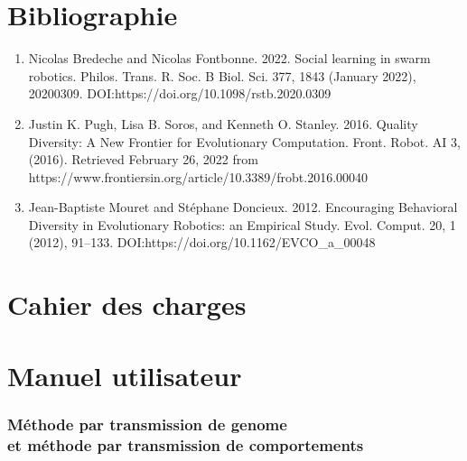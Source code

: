 \documentclass[a4paper, 12pt]{report}
\begin{document}
    \chapter{Bibliographie}
    \begin{enumerate}
	\item {Nicolas Bredeche and Nicolas Fontbonne. 2022. Social learning in swarm robotics. Philos. Trans. R. Soc. B Biol. Sci. 377, 1843 (January 2022), 20200309. DOI:https://doi.org/10.1098/rstb.2020.0309}
    \item{Justin K. Pugh, Lisa B. Soros, and Kenneth O. Stanley. 2016. Quality Diversity: A New Frontier for Evolutionary Computation. Front. Robot. AI 3, (2016). Retrieved February 26, 2022 from https://www.frontiersin.org/article/10.3389/frobt.2016.00040}
\item{Jean-Baptiste Mouret and Stéphane Doncieux. 2012. Encouraging Behavioral Diversity in Evolutionary Robotics: an Empirical Study. Evol. Comput. 20, 1 (2012), 91–133. DOI:https://doi.org/10.1162/EVCO\_a\_00048}
    \end{enumerate}


    \chapter{Cahier des charges}
    \begin{figure}[H]
		
    \end{figure}
    \chapter{Manuel utilisateur}
    
    
    \subsection{Méthode par transmission de genome \\ et méthode par transmission de comportements}
    
\end{document}
